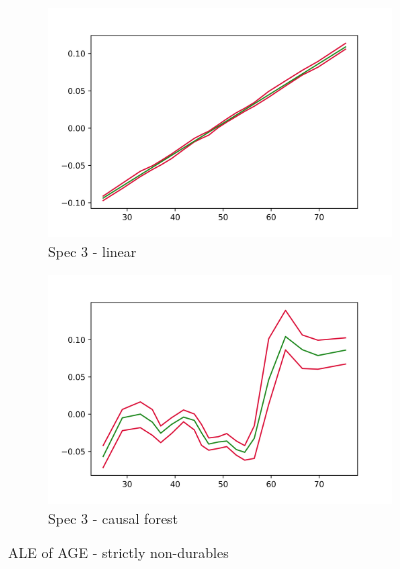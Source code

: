 \begin{figure}[h]
    \begin{subfigure}{0.5\linewidth}
        \includegraphics[width=\linewidth]{figures/ALE/chFDexp/spec3_linear_AGE.png}
        \caption{Spec 3 - linear}
    \end{subfigure}%
    \begin{subfigure}{0.5\linewidth}
        \includegraphics[width=\linewidth]{figures/ALE/chFDexp/spec3_cf_AGE.png}
        \caption{Spec 3 - causal forest}
    \end{subfigure}
    \caption{ALE of AGE - strictly non-durables}
    \label{app:ale_age_fd}
\end{figure}

